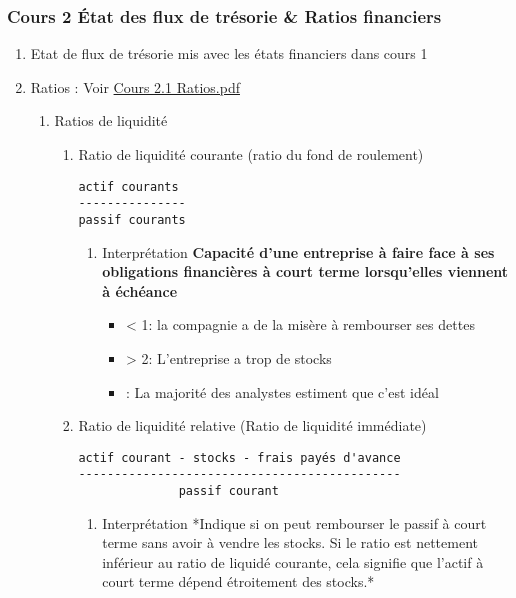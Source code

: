 \documentclass[11pt]{article}
\begin{document}
\subsubsection{Cours 2 État des flux de trésorie \& Ratios financiers}
\label{sec:orgaf8da0c}
\begin{enumerate}
\item Etat de flux de trésorie mis avec les états financiers dans cours 1
\label{sec:org75b226c}
\item Ratios : Voir \href{https://moodle.polymtl.ca/pluginfile.php/512706/mod\_folder/content/0/Cours\%25202.1\%2520-\%2520Ratios.pdf?forcedownload=0}{Cours 2.1 Ratios.pdf}
\label{sec:orge4adedb}
\begin{enumerate}
\item Ratios de liquidité
\label{sec:org6bb99a6}
\begin{enumerate}
\item Ratio de liquidité courante (ratio du fond de roulement)
\label{sec:orga6d1c4f}
\begin{verbatim}
actif courants
---------------
passif courants
\end{verbatim}
\begin{enumerate}
\item Interprétation
\label{sec:orgca1e79c}
\textbf{Capacité d'une entreprise à faire face à ses obligations financières à court
terme lorsqu'elles viennent à échéance}
\begin{itemize}
\item < 1: la compagnie a de la misère à rembourser ses dettes
\item > 2: L'entreprise a trop de stocks
\item\relax [1.2, 2.0] : La majorité des analystes estiment que c'est idéal
\end{itemize}
\end{enumerate}
\item Ratio de liquidité relative (Ratio de liquidité immédiate)
\label{sec:org853b150}
\begin{verbatim}
actif courant - stocks - frais payés d'avance
---------------------------------------------
              passif courant
\end{verbatim}
\begin{enumerate}
\item Interprétation
\label{sec:org51d374f}
*Indique si on peut rembourser le passif à court terme sans avoir à vendre les
stocks. Si le ratio est nettement inférieur au ratio de liquidé courante, cela
signifie que l'actif à court terme dépend étroitement des stocks.*

\end{enumerate}
\end{enumerate}
\end{enumerate}
\end{enumerate}
\end{document}
